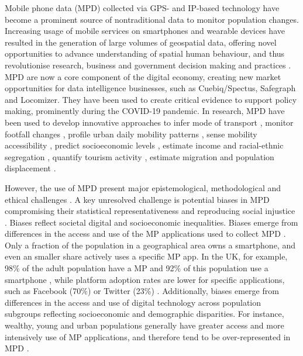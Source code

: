 \documentclass[]{rsos}%
\begin{document}
Mobile phone data (MPD) collected via GPS- and IP-based technology have
become a prominent source of nontraditional data to monitor population
changes. Increasing usage of mobile services on smartphones and wearable
devices have resulted in the generation of large volumes of geospatial
data, offering novel opportunities to advance understanding of spatial
human behaviour, and thus revolutionise research, business and
government decision making and practices \citep{rowe23-bigdata}. MPD are now
a core component of the digital economy, creating new market
opportunities for data intelligence businesses, such as Cuebiq/Spectus,
Safegraph and Locomizer. They have been used to create critical evidence
to support policy making, prominently during the COVID-19 pandemic. In
research, MPD have been used to develop innovative approaches to infer
mode of transport \citep{graells-garrido2023}, monitor footfall changes
\citep{ballantyne2022, hunter2021}, profile urban daily mobility patterns
\citep{cabrera-arnau2023, mavrogeni25, kakimoto25}, sense mobility accessibility
\citep{graells-garrido2021}, predict socioeconomic levels \citep{soto2011, blumenstock2015}, estimate income \citep{moro2021} and racial-ethnic segregation \citep{Xu2024}, quantify tourism activity \citep{raun2016}, estimate migration \citep{cepal24, gonzález-leonardo2025} and population displacement \citep{rowe2022, iradukunda2025, cabrera25}.

However, the use of MPD present major epistemological, methodological
and ethical challenges \citep{rowe23-bigdata}. A key unresolved challenge is
potential biases in MPD compromising their statistical
representativeness and reproducing social injustice
\citep{wesolowski13-biases}. Biases reflect societal digital and
socioeconomic inequalities. Biases emerge from differences in the access
and use of the MP applications used to collect MPD \citep{porter2012, wesolowski13-biases}. Only a fraction of the population in a
geographical area owns a smartphone, and even an smaller share actively
uses a specific MP app. In the UK, for example, 98\% of the adult
population have a MP and 92\% of this population use a smartphone
\citep{ofcom23}, while platform adoption rates are lower for specific
applications, such as Facebook (70\%) or Twitter (23\%) \citep{statista24}.
Additionally, biases emerge from differences in the access and use of
digital technology across population subgroups reflecting socioeconomic
and demographic disparities. For instance, wealthy, young and urban
populations generally have greater access and more intensively use of MP
applications, and therefore tend to be over-represented in MPD
\citep{blumenstock2010, wesolowski13-biases, schlosser21-biases}.
\end{document}
